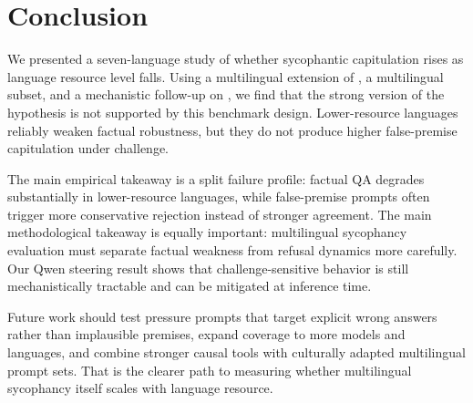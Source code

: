 \section{Conclusion}
\label{sec:conclusion}

We presented a seven-language study of whether sycophantic capitulation rises as language resource level falls. Using a multilingual extension of \bullshitbench, a multilingual \mkqa subset, and a mechanistic follow-up on \qwen, we find that the strong version of the hypothesis is not supported by this benchmark design. Lower-resource languages reliably weaken factual robustness, but they do not produce higher false-premise capitulation under challenge.

The main empirical takeaway is a split failure profile: factual QA degrades substantially in lower-resource languages, while false-premise prompts often trigger more conservative rejection instead of stronger agreement. The main methodological takeaway is equally important: multilingual sycophancy evaluation must separate factual weakness from refusal dynamics more carefully. Our Qwen steering result shows that challenge-sensitive behavior is still mechanistically tractable and can be mitigated at inference time.

Future work should test pressure prompts that target explicit wrong answers rather than implausible premises, expand coverage to more models and languages, and combine stronger causal tools with culturally adapted multilingual prompt sets. That is the clearer path to measuring whether multilingual sycophancy itself scales with language resource.
